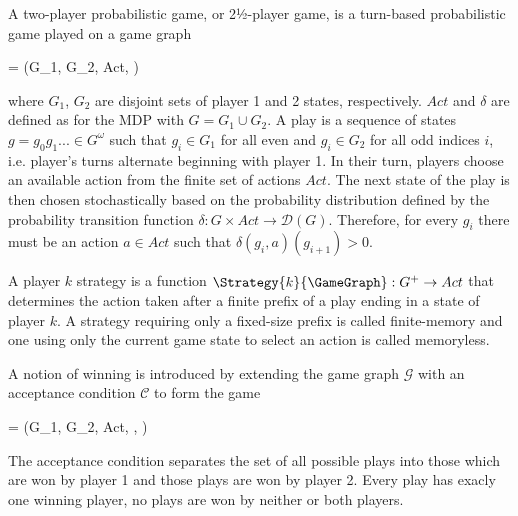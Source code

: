 \stopsubsection


\startsubsection[title={2-Player Probabilistic Games},reference=sec:theory-games-games]

    A two-player probabilistic game, or 2½-player game, is a turn-based probabilistic game played on a game graph

    \startformula
         = (G_1, G_2, Act, \delta) \EndComma
    \stopformula

    where $G_1$, $G_2$ are disjoint sets of player 1 and 2 states, respectively.
    $Act$ and $\delta$ are defined as for the MDP with $G = G_1 \cup G_2$.
    A play is a sequence of states $g = g_0 g_1 ... \in G^\omega$ such that $g_i \in G_1$ for all even and $g_i \in G_2$ for all odd indices $i$, i.e. player's turns alternate beginning with player 1. %
    In their turn, players choose an available action from the finite set of actions $Act$.
    The next state of the play is then chosen stochastically based on the probability distribution defined by the probability transition function $\delta: G \times Act \rightarrow \mathcal{D}(G)$.
    Therefore, for every $g_i$ there must be an action $a \in Act$ such that $\delta(g_i, a)(g_{i+1}) \gt 0$.

    A player $k$ strategy is a function $\Strategy{k}{\GameGraph}: G^+ \rightarrow Act$ that determines the action taken after a finite prefix of a play ending in a state of player $k$.
    A strategy requiring only a fixed-size prefix is called finite-memory and one using only the current game state to select an action is called memoryless.

\stopsubsection


\startsubsection[title={Winning and Solving 2-Player Probabilistic Games}]

    A notion of winning is introduced by extending the game graph $\mathcal{G}$ with an acceptance condition $\mathcal{C}$ to form the game

    \startformula
         = (G_1, G_2, Act, \delta, ) \EndPeriod
    \stopformula

    The acceptance condition separates the set of all possible plays into those which are won by player 1 and those plays are won by player 2.
    Every play has exacly one winning player, no plays are won by neither or both players.

